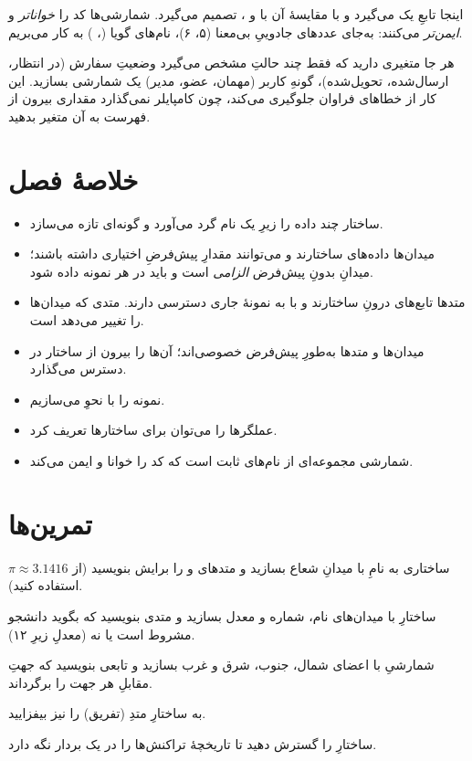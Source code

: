 اینجا تابعِ  یک  می‌گیرد و با مقایسهٔ آن با
 و ، تصمیم می‌گیرد. شمارشی‌ها کد را
\emph{خواناتر} و \emph{ایمن‌تر} می‌کنند: به‌جای عددهای جادوییِ بی‌معنا (۵، ۶)،
نام‌های گویا (، ) به کار می‌بریم.

\begin{tip}
هر جا متغیری دارید که فقط چند حالتِ مشخص می‌گیرد وضعیتِ سفارش (در انتظار،
ارسال‌شده، تحویل‌شده)، گونهِ کاربر (مهمان، عضو، مدیر) یک شمارشی بسازید. این
کار از خطاهای فراوان جلوگیری می‌کند، چون کامپایلر نمی‌گذارد مقداری بیرون از
فهرست به آن متغیر بدهید.
\end{tip}

\section{خلاصهٔ فصل}

\begin{itemize}
  \item ساختار چند داده را زیرِ یک نام گرد می‌آورد و گونه‌ای تازه می‌سازد.
  \item میدان‌ها داده‌های ساختارند و می‌توانند مقدارِ پیش‌فرضِ اختیاری داشته
        باشند؛ میدانِ بدونِ پیش‌فرض \emph{الزامی} است و باید در هر نمونه داده شود.
  \item متدها تابع‌های درونِ ساختارند و با  به نمونهٔ جاری دسترسی
        دارند. متدی که میدان‌ها را تغییر می‌دهد  است.
  \item میدان‌ها و متدها به‌طورِ پیش‌فرض خصوصی‌اند؛  آن‌ها را
        بیرون از ساختار در دسترس می‌گذارد.
  \item نمونه را با نحوِ  می‌سازیم.
  \item عملگرها را می‌توان برای ساختارها تعریف کرد.
  \item شمارشی مجموعه‌ای از نام‌های ثابت است که کد را خوانا و ایمن می‌کند.
\end{itemize}

\section{تمرین‌ها}

\exercise ساختاری به نامِ  با میدانِ شعاع بسازید و متدهای
 و  را برایش بنویسید (از $\pi \approx 3.1416$ استفاده
کنید).

\exercise ساختارِ  با میدان‌های نام، شماره و معدل بسازید و متدی
بنویسید که بگوید دانشجو مشروط است یا نه (معدلِ زیرِ ۱۲).

\exercise شمارشیِ  با اعضای شمال، جنوب، شرق و غرب بسازید و تابعی
بنویسید که جهتِ مقابلِ هر جهت را برگرداند.

\exercise به ساختارِ  متدِ  (تفریق) را نیز بیفزایید.

\exercise ساختارِ  را گسترش دهید تا تاریخچهٔ تراکنش‌ها را در یک بردار
نگه دارد.
